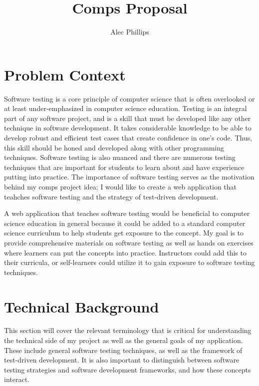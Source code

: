 \documentclass[10pt,twocolumn]{article}
\title{Comps Proposal}
\author{Alec Phillips}
\affiliation{Occidental College}
\begin{document}
\maketitle

\section{Problem Context}


Software testing is a core principle of computer science that is often overlooked or at least under-emphasized in 
computer science education. Testing is an integral part of any software project, and is a skill that must be developed 
like any other technique in software development. It takes considerable knowledge to be able to develop robust and 
efficient test cases that create confidence in one's code. Thus, this skill should be honed and developed along with 
other programming techniques. Software testing is also nuanced and there are numerous testing techniques that are 
important for students to learn about and have experience putting into practice. The importance of software testing 
serves as the motivation behind my comps project idea; I would like to create a web application that teahches software 
testing and the strategy of test-driven development. 

A web application that teaches software testing would be beneficial to computer science education in general because 
it could be added to a standard computer science curriculum to help students get exposure to the concept. My goal is to 
provide comprehensive materials on software testing as well as hands on exercises where learners can put the concepts 
into practice. Instructors could add this to their curricula, or self-learners could utilize it to gain exposure to 
software testing techniques. 

\section{Technical Background}

This section will cover the relevant terminology that is critical for understanding the technical side of my project as
well as the general goals of my application. These include general software testing techniques, as well as the framework 
of test-driven development. It is also important to distinguish between software testing strategies and software 
development frameworks, and how these concepts interact.
\end{document}
